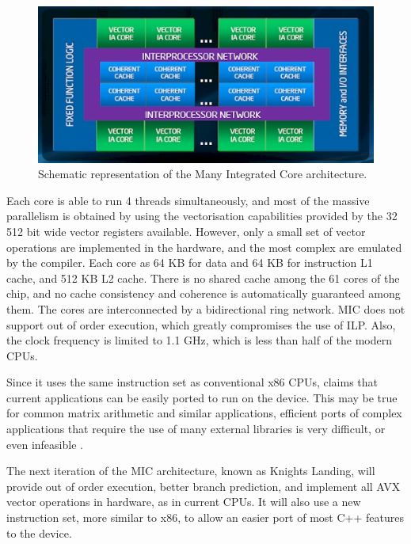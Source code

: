 \begin{figure}[!htp]
	\begin{center}
		\includegraphics[scale=0.65]{imgs/mic.png}
		\caption{Schematic representation of the \intel Many Integrated Core architecture.}
		\label{fig:mic}
	\end{center}
\end{figure}

Each core is able to run 4 threads simultaneously, and most of the massive parallelism is obtained by using the vectorisation capabilities provided by the 32 512 bit wide vector registers available. However, only a small set of vector operations are implemented in the hardware, and the most complex are emulated by the compiler. Each core as 64 KB for data and 64 KB for instruction L1 cache, and 512 KB L2 cache. There is no shared cache among the 61 cores of the chip, and no cache consistency and coherence is automatically guaranteed among them. The cores are interconnected by a bidirectional ring network. MIC does not support out of order execution, which greatly compromises the use of ILP. Also, the clock frequency is limited to 1.1 GHz, which is less than half of the modern CPUs.

Since it uses the same instruction set as conventional x86 CPUs, \intel claims that current applications can be easily ported to run on the device. This may be true for common matrix arithmetic and similar applications, efficient ports of complex applications that require the use of many external libraries is very difficult, or even infeasible \cite{Msc:AMP}.

The next iteration of the MIC architecture, known as Knights Landing, will provide out of order execution, better branch prediction, and implement all AVX vector operations in hardware, as in current \intel CPUs. It will also use a new instruction set, more similar to x86, to allow an easier port of most C++ features to the device.

